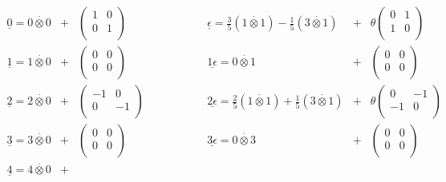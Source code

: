 \documentclass[a4paper,11pt]{article}
\def \otimesdot {\stackrel{\cdot}{\otimes}}
\begin{document}
$$
\begin{array}{cccclcc}
\underline{0}         = 0     \otimesdot 0 &+&
\left( \begin{array}{cc} 1 & 0 \\ 0 & 1 \\ \end{array} \right)
& \qquad \qquad &
\underline{\epsilon}  = \frac{3}{5} (1 \otimesdot 1) - \frac{1}{5} (3
\otimesdot 1)                       &+&
\theta \left( \begin{array}{cc} 0 & 1 \\ 1 & 0 \\ \end{array} \right) \\
\underline{1}         = 1     \otimesdot 0 &+&
\left( \begin{array}{cc} 0 & 0 \\ 0 & 0 \\ \end{array} \right)
&{}&
\underline{1\epsilon} = 0     \otimesdot 1 &+&
\left( \begin{array}{cc} 0 & 0 \\ 0 & 0 \\ \end{array} \right) \\
\underline{2}         = 2     \otimesdot 0 &+&
\left( \begin{array}{cc} -1 & 0 \\ 0 & -1 \\ \end{array} \right)
&{}&
\underline{2\epsilon} = \frac{2}{5} (1 \otimesdot 1) + \frac{1}{5} (3
\otimesdot 1)                      &+&
\theta \left( \begin{array}{cc} 0 & -1 \\ -1 & 0 \\ \end{array} \right)\\
\underline{3}         = 3     \otimesdot 0 &+&
\left( \begin{array}{cc} 0 & 0 \\ 0 & 0 \\ \end{array} \right)
&{}&
\underline{3\epsilon} = 0     \otimesdot 3 &+&
\left( \begin{array}{cc} 0 & 0 \\ 0 & 0 \\ \end{array} \right)\\
\underline{4}         = 4     \otimesdot 0 &+&

\end{array}$$
\end{document}
